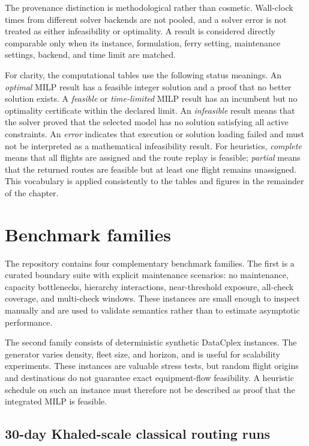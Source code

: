 The provenance distinction is methodological rather than cosmetic. Wall-clock
times from different solver backends are not pooled, and a solver error is not
treated as either infeasibility or optimality. A result is considered directly
comparable only when its instance, formulation, ferry setting, maintenance
settings, backend, and time limit are matched.

For clarity, the computational tables use the following status meanings. An
\emph{optimal} MILP result has a feasible integer solution and a proof that no
better solution exists. A \emph{feasible} or \emph{time-limited} MILP result
has an incumbent but no optimality certificate within the declared limit. An
\emph{infeasible} result means that the solver proved that the selected model
has no solution satisfying all active constraints. An \emph{error} indicates
that execution or solution loading failed and must not be interpreted as a
mathematical infeasibility result. For heuristics, \emph{complete} means that
all flights are assigned and the route replay is feasible; \emph{partial}
means that the returned routes are feasible but at least one flight remains
unassigned. This vocabulary is applied consistently to the tables and figures
in the remainder of the chapter.

\section{Benchmark families}
\label{sec:computational_instances}

The repository contains four complementary benchmark families. The first is a
curated boundary suite with explicit maintenance scenarios: no maintenance,
capacity bottlenecks, hierarchy interactions, near-threshold exposure, all-check
coverage, and multi-check windows. These instances are small enough to inspect
manually and are used to validate semantics rather than to estimate asymptotic
performance.

The second family consists of deterministic synthetic DataCplex instances. The
generator varies density, fleet size, and horizon, and is useful for scalability
experiments. These instances are valuable stress tests, but random flight
origins and destinations do not guarantee exact equipment-flow feasibility. A
heuristic schedule on such an instance must therefore not be described as proof
that the integrated MILP is feasible.

\subsection{30-day Khaled-scale classical routing runs}
\label{subsec:khaled_30day_classical}

